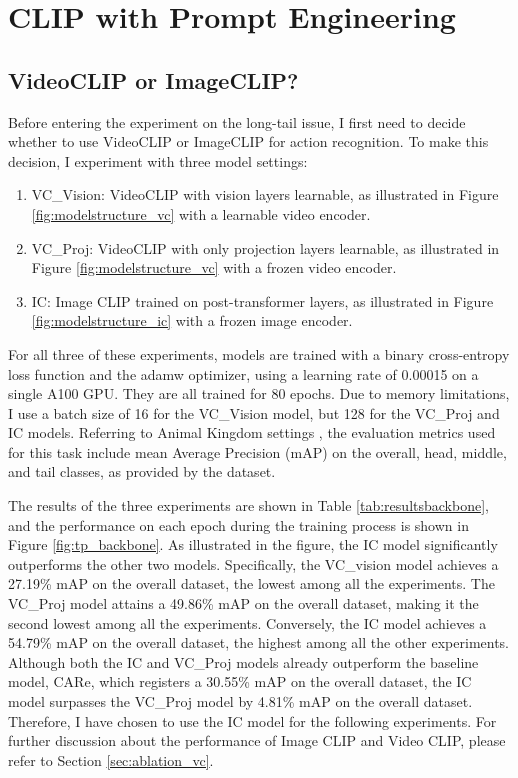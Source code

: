 \section{CLIP with Prompt Engineering}
\subsection{VideoCLIP or ImageCLIP?}
\label{sec:imageclipbetter}
Before entering the experiment on the long-tail issue, I first need to decide whether to use VideoCLIP or ImageCLIP for action recognition. To make this decision, I experiment with three model settings: 

\begin{enumerate}
    \item VC\_Vision: VideoCLIP with vision layers learnable, as illustrated in Figure \ref{fig:modelstructure_vc} with a learnable video encoder.
    \item VC\_Proj: VideoCLIP with only projection layers learnable, as illustrated in Figure \ref{fig:modelstructure_vc} with a frozen video encoder.
    \item IC: Image CLIP trained on post-transformer layers, as illustrated in Figure \ref{fig:modelstructure_ic} with a frozen image encoder.
\end{enumerate}

For all three of these experiments, models are trained with a binary cross-entropy loss function and the adamw optimizer, using a learning rate of 0.00015 on a single A100 GPU. They are all trained for 80 epochs. Due to memory limitations, I use a batch size of 16 for the VC\_Vision model, but 128 for the VC\_Proj and IC models. Referring to Animal Kingdom settings \parencite{ng2022animal}, the evaluation metrics used for this task include mean Average Precision (mAP) on the overall, head, middle, and tail classes, as provided by the dataset. 


The results of the three experiments are shown in Table \ref{tab:resultsbackbone}, and the performance on each epoch during the training process is shown in Figure \ref{fig:tp_backbone}. As illustrated in the figure, the IC model significantly outperforms the other two models. Specifically, the VC\_vision model achieves a 27.19\% mAP on the overall dataset, the lowest among all the experiments. The VC\_Proj model attains a 49.86\% mAP on the overall dataset, making it the second lowest among all the experiments. Conversely, the IC model achieves a 54.79\% mAP on the overall dataset, the highest among all the other experiments. Although both the IC and VC\_Proj models already outperform the baseline model, CARe, which registers a 30.55\% mAP on the overall dataset, the IC model surpasses the VC\_Proj model by 4.81\% mAP on the overall dataset. Therefore, I have chosen to use the IC model for the following experiments. For further discussion about the performance of Image CLIP and Video CLIP, please refer to Section \ref{sec:ablation_vc}.

